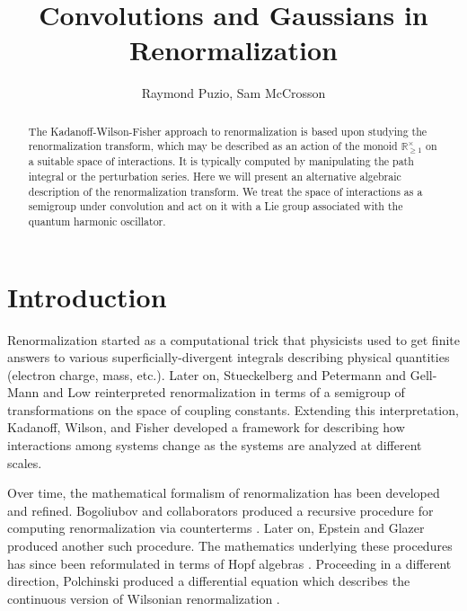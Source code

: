 \documentclass[12pt]{article}
\title{Convolutions and Gaussians in Renormalization}
\author{Raymond Puzio,
        Sam McCrosson}
\newcounter{counter}
\theoremstyle{definition}
\theoremstyle{plain}
\begin{document}
\maketitle

\begin{abstract}
The Kadanoff-Wilson-Fisher approach to renormalization is based upon studying the renormalization transform, which may be described as an action of the monoid \(\mathbb{R}^\times_{\ge 1}\) on a suitable space of interactions. It is typically computed by manipulating the path integral or the perturbation series.  Here we will present an alternative algebraic description of the renormalization transform. We treat the space of interactions as a semigroup under convolution and act on it with a Lie group associated with the quantum harmonic oscillator. 
\end{abstract}

\tableofcontents

\pagebreak

\section{Introduction} \label{Intro}

Renormalization started as a computational trick that physicists used to get finite answers to various superficially-divergent integrals describing physical quantities (electron charge, mass, etc.).\cite{huang2013critical}  Later on, Stueckelberg and Petermann \cite{stueckelberg1953normalization} and Gell-Mann and Low \cite{gell1954quantum} reinterpreted renormalization in terms of a semigroup of transformations on the space of coupling constants.  Extending this interpretation, Kadanoff, Wilson, and Fisher \cite{fisher1998renormalization} developed a framework for describing how interactions among systems change as the systems are analyzed at different scales.

Over time, the mathematical formalism of renormalization has been developed and refined.  Bogoliubov and collaborators produced a recursive procedure for computing renormalization via counterterms \cite{bogoliubov1960introduction, hepp1966proof, zimmermann2000convergence}.
Later on, Epstein and Glazer produced another such procedure. \cite{epstein1973role}  The mathematics underlying these procedures has since been reformulated in terms of
Hopf algebras \cite{ConnesKriemer1999}.
Proceeding in a different direction, Polchinski produced a differential equation which describes the continuous version of Wilsonian renormalization \cite{polchinski1984renormalization}.
\end{document}
